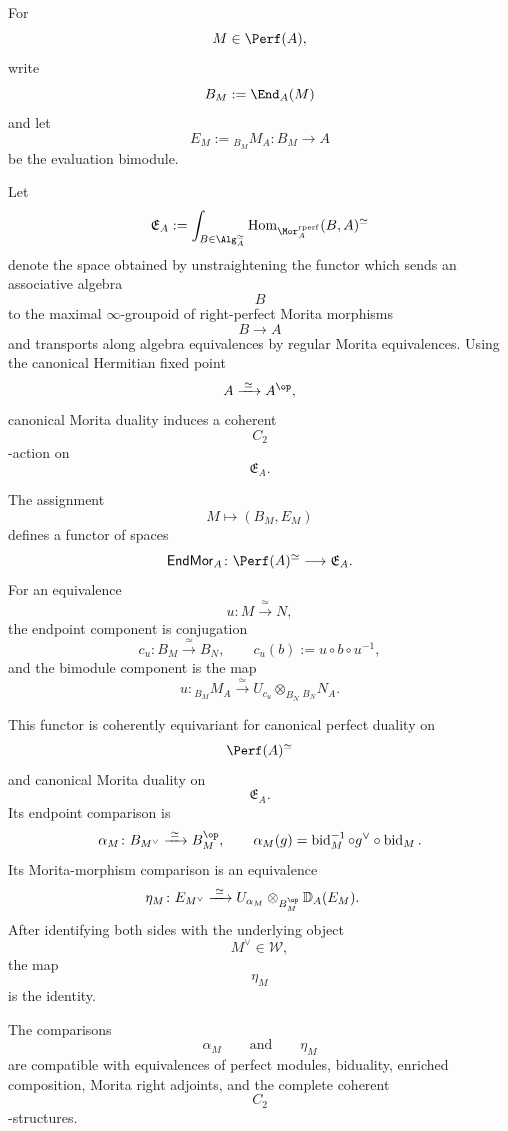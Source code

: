 \begin{proposition}
\label{prop:equivariant-endomorphism-morita-context}
For
\[
    M\in\Perf(A),
\]
write
\[
    B_M
    :=
    \End_A(M)
\]
and let
\[
    E_M
    :=
    {}_{B_M}M_A
    \colon
    B_M
    \longrightarrow
    A
\]
be the evaluation bimodule.

Let
\[
    \mathfrak E_A
    :=
    \int_{B\in\Alg_A^\simeq}
    \operatorname{Hom}_{\Mor_A^{\mathrm{rperf}}}(B,A)^\simeq
\]
denote the space obtained by unstraightening the functor which sends an
associative algebra
\[
    B
\]
to the maximal $\infty$-groupoid of right-perfect Morita morphisms
\[
    B
    \longrightarrow
    A
\]
and transports along algebra equivalences by regular Morita
equivalences. Using the canonical Hermitian fixed point
\[
    A
    \xrightarrow{\;\simeq\;}
    A^{\op},
\]
canonical Morita duality induces a coherent
\[
    C_2
\]
-action on
\[
    \mathfrak E_A.
\]

The assignment
\[
    M
    \longmapsto
    (B_M,E_M)
\]
defines a functor of spaces
\[
    \mathsf{EndMor}_A
    \colon
    \Perf(A)^\simeq
    \longrightarrow
    \mathfrak E_A.
\]
For an equivalence
\[
    u
    \colon
    M
    \xrightarrow{\;\simeq\;}
    N,
\]
the endpoint component is conjugation
\[
    c_u
    \colon
    B_M
    \xrightarrow{\;\simeq\;}
    B_N,
    \qquad
    c_u(b)
    :=
    u\circ b\circ u^{-1},
\]
and the bimodule component is the map
\[
    u
    \colon
    {}_{B_M}M_A
    \xrightarrow{\;\simeq\;}
    U_{c_u}
    \otimes_{B_N}
    {}_{B_N}N_A.
\]

This functor is coherently equivariant for canonical perfect duality on
\[
    \Perf(A)^\simeq
\]
and canonical Morita duality on
\[
    \mathfrak E_A.
\]
Its endpoint comparison is
\[
    \alpha_M
    \colon
    B_{M^\vee}
    \xrightarrow{\;\simeq\;}
    B_M^{\op},
    \qquad
    \alpha_M(g)
    =
    \operatorname{bid}_M^{-1}
    \circ
    g^\vee
    \circ
    \operatorname{bid}_M.
\]
Its Morita-morphism comparison is an equivalence
\[
\begin{aligned}
    \eta_M
    \colon
    E_{M^\vee}
    &\xrightarrow{\;\simeq\;}
    U_{\alpha_M}
    \otimes_{B_M^{\op}}
    \mathbb D_A(E_M).
\end{aligned}
\]
After identifying both sides with the underlying object
\[
    M^\vee\in\mathcal W,
\]
the map
\[
    \eta_M
\]
is the identity.

The comparisons
\[
    \alpha_M
    \qquad\text{and}\qquad
    \eta_M
\]
are compatible with equivalences of perfect modules, biduality,
enriched composition, Morita right adjoints, and the complete coherent
\[
    C_2
\]
-structures.
\end{proposition}

